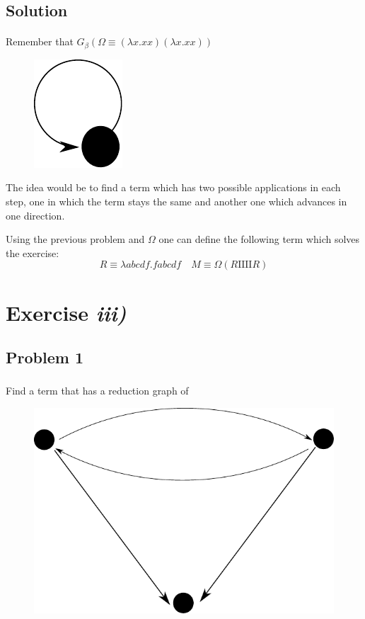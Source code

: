 \documentclass{beamer}
\theoremstyle{definition}
\theoremstyle{remark}
\theoremstyle{example}
\newif\ifinsection
\newif\ifinsubsection
\let\oldsection\section
\renewcommand{\section}{
  \global\insectiontrue
  \global\insubsectionfalse
  \oldsection}
\let\oldsubsection\subsection
\renewcommand{\subsection}{
  \global\insubsectiontrue
  \oldsubsection}
\newcommand {\aframe}[1] {
  \begin{frame}
    \ifinsection\frametitle{\secname}\fi
    \ifinsubsection\framesubtitle{\subsecname}\fi
  #1
  \end{frame}
}
\newcommand{\I}{\pmb{\mathrm{I}}}
\begin{document}
\subsection{Solution}
\aframe{Remember that $G_\beta(\Omega \equiv (\lambda x. xx)(\lambda x. xx))$
  \begin{figure}[H]
    \centering \includegraphics[scale=0.5]{../../graphs/example-omega.pdf}
  \end{figure} \pause \vspace{0.3cm}

  The idea would be to find a term which has two possible applications in each
  step, one in which the term stays the same and another one which advances in
  one direction. \pause \\ \vspace{0.3cm}

  Using the previous problem and $\Omega$ one can define the following term
  which solves the exercise:
  \begin{equation*}
    R \equiv \lambda abcdf. fabcdf  \quad M \equiv \Omega(R \I \I \I \I R)
  \end{equation*}
}

\section{Exercise \textit{iii)}}
\subsection{Problem 1}
\aframe{ Find a term that has a reduction graph of
  \begin{figure}[H]
    \centering
    \includegraphics[scale=0.5]{../../graphs/exercise-3-5-2-iii-1.pdf}
  \end{figure}
}
\end{document}
